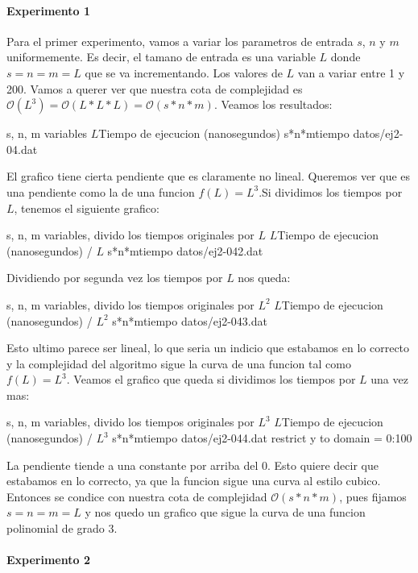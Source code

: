 \paragraph{Experimento 1}

Para el primer experimento, vamos a variar los parametros de entrada $s$, $n$ y $m$ uniformemente. Es decir, el tamano de entrada es una variable $L$ donde $s=n=m=L$ que se va incrementando. Los valores de $L$ van a variar entre 1 y 200. Vamos a querer ver que nuestra cota de complejidad es $\mathcal{O}(L^3)=\mathcal{O}(L*L*L)=\mathcal{O}(s*n*m)$. Veamos los resultados:

\graficarDatos
{s, n, m variables}
{$L$}{Tiempo de ejecucion (nanosegundos)}
{s*n*m}{tiempo}
{datos/ej2-04.dat}

El grafico tiene cierta pendiente que es claramente no lineal. Queremos ver que es una pendiente como la de una funcion $f(L)=L^3$.Si dividimos los tiempos por $L$, tenemos el siguiente grafico:

\graficarDatos
{s, n, m variables, divido los tiempos originales por $L$}
{$L$}{Tiempo de ejecucion (nanosegundos) / $L$}
{s*n*m}{tiempo}
{datos/ej2-042.dat}

Dividiendo por segunda vez los tiempos por $L$ nos queda:

\graficarDatos
{s, n, m variables, divido los tiempos originales por $L^2$}
{$L$}{Tiempo de ejecucion (nanosegundos) / $L^2$}
{s*n*m}{tiempo}
{datos/ej2-043.dat}

Esto ultimo parece ser lineal, lo que seria un indicio que estabamos en lo correcto y la complejidad del algoritmo sigue la curva de una funcion tal como $f(L)=L^3$. Veamos el grafico que queda si dividimos los tiempos por $L$ una vez mas:

\graficarDatosPlus
{s, n, m variables, divido los tiempos originales por $L^3$}
{$L$}{Tiempo de ejecucion (nanosegundos) / $L^3$}
{s*n*m}{tiempo}
{datos/ej2-044.dat}
{restrict y to domain = 0:100}

La pendiente tiende a una constante por arriba del 0. Esto quiere decir que estabamos en lo correcto, ya que la funcion sigue una curva al estilo cubico. Entonces se condice con nuestra cota de complejidad $\mathcal{O}(s*n*m)$, pues fijamos $s=n=m=L$ y nos quedo un grafico que sigue la curva de una funcion polinomial de grado 3.

\paragraph{Experimento 2}

